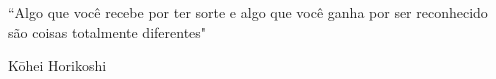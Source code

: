 
\renewcommand{\epigraphname}{EPÍGRAFE}

\begin{epigrafe}
``Algo que você recebe por ter sorte e algo que você ganha por ser reconhecido são coisas totalmente diferentes" 

Kōhei Horikoshi

\end{epigrafe}


